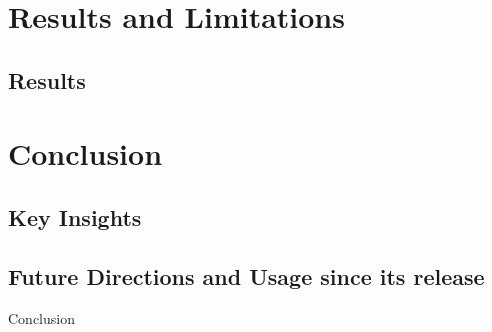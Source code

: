 \documentclass[aspectratio=169,xcolor=dvipsnames]{beamer}
\begin{document}





\section{Results and Limitations}

\subsection{Results}


\section{Conclusion}

\subsection{Key Insights}

\subsection{Future Directions and Usage since its release}

\begin{frame}{Conclusion}

\end{frame}
\end{document}
